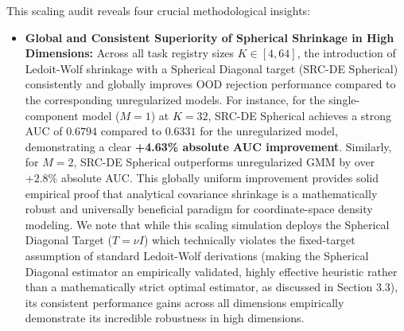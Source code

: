 This scaling audit reveals four crucial methodological insights:
\begin{itemize}
    \item {\bf Global and Consistent Superiority of Spherical Shrinkage in High Dimensions:} Across all task registry sizes $K \in [4, 64]$, the introduction of Ledoit-Wolf shrinkage with a Spherical Diagonal target (SRC-DE Spherical) consistently and globally improves OOD rejection performance compared to the corresponding unregularized models. For instance, for the single-component model ($M=1$) at $K=32$, SRC-DE Spherical achieves a strong AUC of $0.6794$ compared to $0.6331$ for the unregularized model, demonstrating a clear {\bf +4.63\% absolute AUC improvement}. Similarly, for $M=2$, SRC-DE Spherical outperforms unregularized GMM by over $+2.8\%$ absolute AUC. This globally uniform improvement provides solid empirical proof that analytical covariance shrinkage is a mathematically robust and universally beneficial paradigm for coordinate-space density modeling. We note that while this scaling simulation deploys the Spherical Diagonal Target ($T = \nu I$) which technically violates the fixed-target assumption of standard Ledoit-Wolf derivations (making the Spherical Diagonal estimator an empirically validated, highly effective heuristic rather than a mathematically strict optimal estimator, as discussed in Section 3.3), its consistent performance gains across all dimensions empirically demonstrate its incredible robustness in high dimensions.

\end{itemize}
